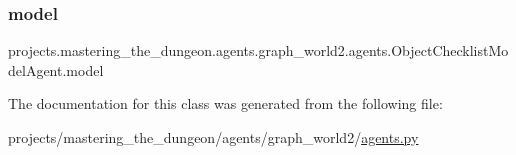 \subsubsection{\texorpdfstring{model}{model}}
{\footnotesize\ttfamily projects.\+mastering\+\_\+the\+\_\+dungeon.\+agents.\+graph\+\_\+world2.\+agents.\+Object\+Checklist\+Model\+Agent.\+model}



The documentation for this class was generated from the following file\+:\begin{DoxyCompactItemize}
\item 
projects/mastering\+\_\+the\+\_\+dungeon/agents/graph\+\_\+world2/\hyperlink{projects_2mastering__the__dungeon_2agents_2graph__world2_2agents_8py}{agents.\+py}\end{DoxyCompactItemize}
